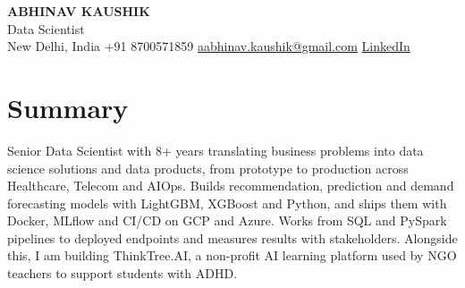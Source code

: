 \documentclass[10pt,a4paper]{article}
\begin{document}
\begin{center}
  {\LARGE\bfseries ABHINAV KAUSHIK}\\[2pt]
  {\large Data Scientist}\\[2pt]
  New Delhi, India \textbar{} +91 8700571859 \textbar{} \href{mailto:aabhinav.kaushik@gmail.com}{aabhinav.kaushik@gmail.com} \textbar{} \href{https://www.linkedin.com/in/abhinav-kaushik10/}{LinkedIn}  
\end{center}

\section{Summary}
Senior Data Scientist with 8+ years translating business problems into data science solutions and data products, from prototype to production across Healthcare, Telecom and AIOps. Builds recommendation, prediction and demand forecasting models with LightGBM, XGBoost and Python, and ships them with Docker, MLflow and CI/CD on GCP and Azure. Works from SQL and PySpark pipelines to deployed endpoints and measures results with stakeholders. Alongside this, I am building ThinkTree.AI, a non-profit AI learning platform used by NGO teachers to support students with ADHD.
\end{document}
